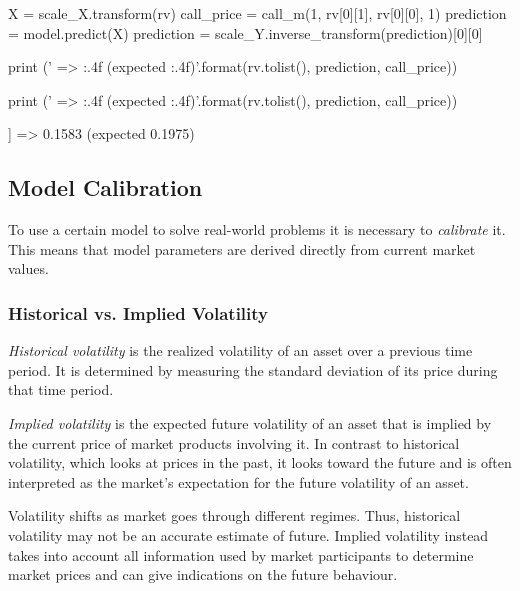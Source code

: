 \begin{ipython}
X = scale_X.transform(rv)
call_price = call_m(1, rv[0][1], rv[0][0], 1)
prediction = model.predict(X)
prediction = scale_Y.inverse_transform(prediction)[0][0]

print ('{} => {:.4f} (expected {:.4f})'.format(rv.tolist(), prediction, call_price))

print ('{} => {:.4f} (expected {:.4f})'.format(rv.tolist(),
                                               prediction,
                                               call_price))
\end{ipython}
\begin{ioutput}
[[0.22, 0.01]] => 0.1583 (expected 0.1975)
\end{ioutput}

\subsection{Model Calibration}\label{model-calibration}

To use a certain model to solve real-world problems it is necessary to \emph{calibrate} it. This means that model parameters are derived directly from current market values. 

\begin{attention}
\subsubsection{Historical vs. Implied Volatility}
\label{historical-vs.-implied-volatility}
	
\emph{Historical volatility} is the realized volatility of an asset over a previous time period. It is determined by measuring the standard deviation of its price during that time period.
	
\emph{Implied volatility} is the expected future volatility of an asset that is implied by the current price of market products involving it.
In contrast to historical volatility, which looks at prices in the past, it looks toward the future and is often interpreted as the market's expectation for the future volatility of an asset.
	
Volatility shifts as market goes through different regimes. Thus, historical volatility may not be an accurate estimate of future. Implied volatility instead takes into account all information used by market participants to determine market prices and can give indications on the future behaviour.
\end{attention}

